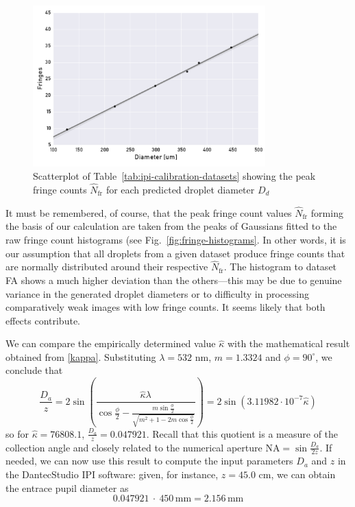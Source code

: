 \documentclass[11.5pt,oneside]{book}
\newcommand*{\figref}[1]{Fig.~\ref{#1}}
\newcommand*{\tableref}[1]{Table~\ref{#1}}
\begin{document}
\begin{figure}[ht!]
    \centering
    \includegraphics[width=0.8\textwidth]{img/fringe_regression.pdf}
    \caption{Scatterplot of \tableref{tab:ipi-calibration-datasets} showing the peak fringe counts $\hat{N}_\text{fr}$ for each predicted droplet diameter $D_d$}
    \label{fig:fringe-regression}
\end{figure}
It must be remembered, of course, that the peak fringe count values
$\hat{N}_\text{fr}$ forming the basis of our calculation are taken from the
peaks of Gaussians fitted to the raw fringe count histograms (see
\figref{fig:fringe-histograms}. In other words, it is our assumption that all
droplets from a given dataset produce fringe counts that are normally
distributed around their respective $\hat{N}_\text{fr}$. The histogram to
dataset FA shows a much higher deviation than the others---this may be due to
genuine variance in the generated droplet diameters or to difficulty in
processing comparatively weak images with low fringe counts. It seems likely
that both effects contribute.

We can compare the empirically determined value $\hat{\kappa}$ with the
mathematical result obtained from \eqref{kappa}. Substituting $\lambda = 532$
nm, $m = 1.3324$ and $\phi = 90^\circ$, we conclude that
\begin{equation}
    \frac{D_a}{z} = 2 \sin \left( \frac{\hat{\kappa} \lambda}{\cos
    \frac{\phi}{2} - \frac{ m \sin \frac{\phi}{2}}{\sqrt{m^2 + 1 - 2m \cos
    \frac{\phi}{2}}}} \right) = 2\sin (3.11982 \cdot 10^{-7} \hat{\kappa})
\end{equation}
so for $\hat{\kappa} = 76808.1$, $\frac{D_a}{z} = 0.047921$. Recall that this
quotient is a measure of the collection angle and closely related to the
numerical aperture NA$=\sin \frac{D_a}{2z}$. If needed, we can now use this
result to compute the input parameters $D_a$ and $z$ in the DantecStudio IPI
software: given, for instance, $z = 45.0$ cm, we can obtain the entrace pupil
diameter as
\begin{equation}
    0.047921~\cdot~450\,\mathrm{mm} = 2.156\,\mathrm{mm}
\end{equation}
\end{document}
